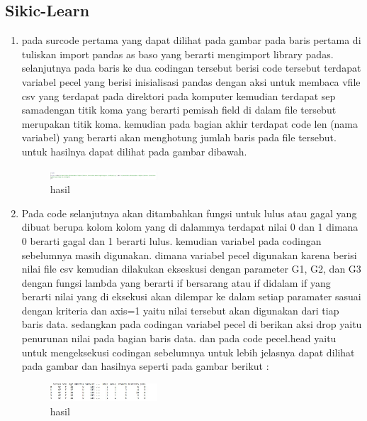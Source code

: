 \subsection{Sikic-Learn}
\begin{enumerate}
\item pada surcode pertama yang dapat dilihat pada gambar  pada baris pertama di tuliskan import pandas as baso yang berarti mengimport library padas. selanjutnya pada baris ke dua codingan tersebut berisi code tersebut terdapat variabel pecel yang berisi inisialisasi pandas dengan aksi untuk membaca vfile csv yang terdapat pada direktori pada komputer kemudian terdapat sep samadengan titik koma yang berarti pemisah field di dalam file tersebut merupakan titik koma. kemudian pada bagian akhir terdapat code len (nama variabel) yang berarti akan menghotung jumlah baris pada file tersebut. untuk hasilnya dapat dilihat pada gambar dibawah.


\begin{figure}[H]
\centering
\includegraphics[width= 4cm]{figures/1174039/chapter2/10.JPG}
\caption{hasil}

\end{figure}


\item Pada code selanjutnya akan ditambahkan fungsi untuk lulus atau gagal yang dibuat berupa kolom kolom yang di dalammya terdapat nilai 0 dan 1 dimana 0 berarti gagal dan 1 berarti lulus. kemudian variabel pada codingan sebelumnya masih digunakan. dimana variabel pecel digunakan karena berisi nilai file csv kemudian dilakukan ekseskusi dengan parameter G1, G2, dan G3 dengan fungsi lambda yang berarti if bersarang atau if didalam if yang berarti nilai yang di eksekusi akan dilempar ke dalam setiap paramater sasuai dengan kriteria dan axis=1 yaitu nilai tersebut akan digunakan dari tiap baris data. sedangkan pada codingan variabel pecel di berikan aksi drop yaitu penurunan nilai pada bagian baris data. dan pada code pecel.head yaitu untuk mengeksekusi codingan sebelumnya untuk lebih jelasnya dapat dilihat pada gambar dan hasilnya seperti pada gambar berikut :

\begin{figure}[H]
\centering
\includegraphics[width= 4cm]{figures/1174039/chapter2/11.JPG}
\caption{hasil}


\end{figure}
\end{enumerate}
